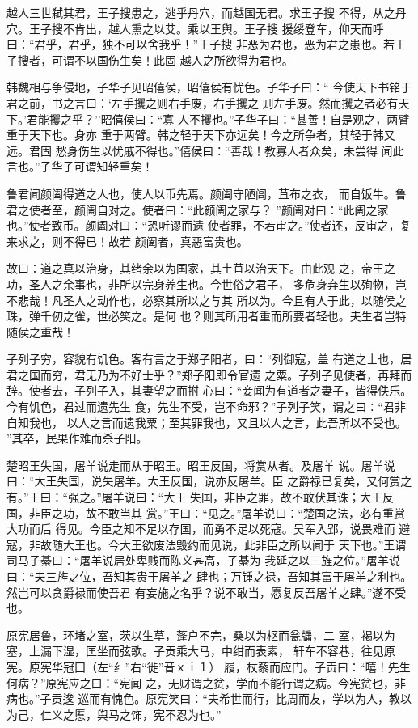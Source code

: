 \documentclass[]{article}
\begin{document}
越人三世弑其君，王子搜患之，逃乎丹穴，而越国无君。求王子搜
不得，从之丹穴。王子搜不肯出，越人熏之以艾。乘以王舆。王子搜
援绥登车，仰天而呼曰：``君乎，君乎，独不可以舍我乎！''王子搜
非恶为君也，恶为君之患也。若王子搜者，可谓不以国伤生矣！此固
越人之所欲得为君也。

韩魏相与争侵地，子华子见昭僖侯，昭僖侯有忧色。子华子曰：``
今使天下书铭于君之前，书之言曰：`左手攫之则右手废，右手攫之
则左手废。然而攫之者必有天下。'君能攫之乎？''昭僖侯曰：``寡
人不攫也。''子华子曰：``甚善！自是观之，两臂重于天下也。身亦
重于两臂。韩之轻于天下亦远矣！今之所争者，其轻于韩又远。君固
愁身伤生以忧戚不得也。''僖侯曰：``善哉！教寡人者众矣，未尝得
闻此言也。''子华子可谓知轻重矣！

鲁君闻颜阖得道之人也，使人以币先焉。颜阖守陋闾，苴布之衣，
而自饭牛。鲁君之使者至，颜阖自对之。使者曰：``此颜阖之家与？
''颜阖对曰：``此阖之家也。''使者致币。颜阖对曰：``恐听谬而遗
使者罪，不若审之。''使者还，反审之，复来求之，则不得已！故若
颜阖者，真恶富贵也。

故曰：道之真以治身，其绪余以为国家，其土苴以治天下。由此观
之，帝王之功，圣人之余事也，非所以完身养生也。今世俗之君子，
多危身弃生以殉物，岂不悲哉！凡圣人之动作也，必察其所以之与其
所以为。今且有人于此，以随侯之珠，弹千仞之雀，世必笑之。是何
也？则其所用者重而所要者轻也。夫生者岂特随侯之重哉！

子列子穷，容貌有饥色。客有言之于郑子阳者，曰：``列御寇，盖
有道之士也，居君之国而穷，君无乃为不好士乎？''郑子阳即令官遗
之粟。子列子见使者，再拜而辞。使者去，子列子入，其妻望之而拊
心曰：``妾闻为有道者之妻子，皆得佚乐。今有饥色，君过而遗先生
食，先生不受，岂不命邪？''子列子笑，谓之曰∶``君非自知我也，
以人之言而遗我粟；至其罪我也，又且以人之言，此吾所以不受也。
''其卒，民果作难而杀子阳。

楚昭王失国，屠羊说走而从于昭王。昭王反国，将赏从者。及屠羊
说。屠羊说曰：``大王失国，说失屠羊。大王反国，说亦反屠羊。臣
之爵禄已复矣，又何赏之有。''王曰：``强之。''屠羊说曰：``大王
失国，非臣之罪，故不敢伏其诛；大王反国，非臣之功，故不敢当其
赏。''王曰：``见之。''屠羊说曰：``楚国之法，必有重赏大功而后
得见。今臣之知不足以存国，而勇不足以死寇。吴军入郢，说畏难而
避寇，非故随大王也。今大王欲废法毁约而见说，此非臣之所以闻于
天下也。''王谓司马子綦曰：``屠羊说居处卑贱而陈义甚高，子綦为
我延之以三旌之位。''屠羊说曰：``夫三旌之位，吾知其贵于屠羊之
肆也；万锺之禄，吾知其富于屠羊之利也。然岂可以贪爵禄而使吾君
有妄施之名乎？说不敢当，愿复反吾屠羊之肆。''遂不受也。

原宪居鲁，环堵之室，茨以生草，蓬户不完，桑以为枢而瓮牖，二
室，褐以为塞，上漏下湿，匡坐而弦歌。子贡乘大马，中绀而表素，
轩车不容巷，往见原宪。原宪华冠囗（左``纟''右``徙''音ｘｉ１）
履，杖藜而应门。子贡曰：``嘻！先生何病？''原宪应之曰：``宪闻
之，无财谓之贫，学而不能行谓之病。今宪贫也，非病也。''子贡逡
巡而有愧色。原宪笑曰：``夫希世而行，比周而友，学以为人，教以
为己，仁义之慝，舆马之饰，宪不忍为也。''
\end{document}
